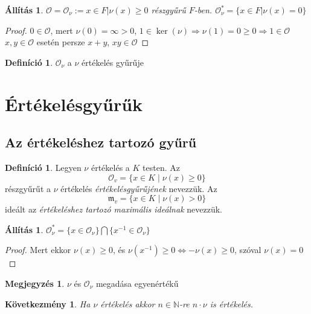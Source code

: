 \documentclass[11pt,a4paper]{article}
\newtheorem{allitas}[tetel]{Állítás}
\newtheorem{kovetkezmeny}[tetel]{Következmény}
\theoremstyle{definition}
\newtheorem{definicio}[tetel]{Definíció}
\newtheorem{megjegyzes}[tetel]{Megjegyzés}
\newcommand{\OO}{\mathcal O}
\newcommand{\mm}{\mathfrak m}
\begin{document}
\begin{allitas}
$\OO=\OO_\nu:={x\in F |\nu(x)\geq0}$ részgyűrű $F$-ben. $\OO_\nu^*=\{x\in F |\nu(x)=0\}$
\end{allitas}
\begin{proof}
$0\in \OO$, mert $\nu(0)= \infty>0$, $1\in \ker(\nu) \Rightarrow \nu(1)=0\geq0\Rightarrow 1\in \OO$
$x,y\in \OO $ esetén persze $x+y$, $xy\in\OO$

\end{proof}
\begin{definicio}
    $\OO_\nu$ a $\nu$ értékelés gyűrűje
\end{definicio}













\section{Értékelésgyűrűk}

\subsection{Az értékeléshez tartozó gyűrű}

\begin{definicio}
Legyen $
\nu$ értékelés a $K$ testen. Az
\[
  \OO_v=\{x\in K\mid 
\nu(x)\geq 0\}
\]
részgyűrűt a $
\nu$ értékelés \emph{értékelésgyűrűjének} nevezzük. Az
\[
  \mm_v=\{x\in K\mid 
\nu(x)>0\}
\]
ideált az \emph{értékeléshez tartozó maximális ideálnak} nevezzük.
\end{definicio}

\begin{allitas}
    $\OO_\nu^*= \{x\in \OO_\nu \}\bigcap\{x^{-1}\in \OO_\nu \}$
\end{allitas}


\begin{proof}
Mert  ekkor $\nu(x)\geq0$, és $\nu(x^{-1})\geq0 \Leftrightarrow -\nu(x)\geq0$, szóval $\nu(x) =0$
\end{proof}

\begin{megjegyzes}
    $\nu$ és $\OO_\nu$ megadása egyenértékű
\end{megjegyzes}

\begin{kovetkezmeny}
    Ha $\nu$ értékelés akkor $n\in \mathbb{N}$-re $n\cdot \nu$ is értékelés.
\end{kovetkezmeny}
\end{document}
